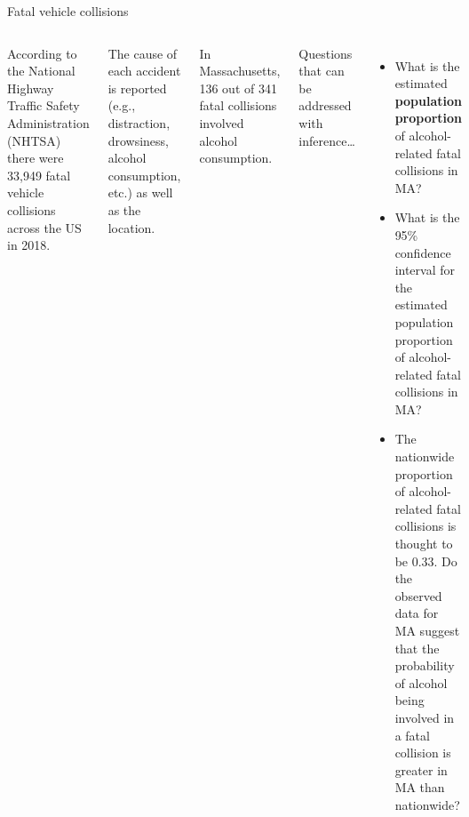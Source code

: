 \documentclass[
  ignorenonframetext,
  aspectratio=169]{beamer}
\newcommand{\columnsbegin}{\begin{columns}}
\newcommand{\columnsend}{\end{columns}}
\begin{document}
\begin{frame}{Fatal vehicle collisions}
\protect\hypertarget{fatal-vehicle-collisions}{}
\columnsbegin


\footnotesize

According to the National Highway Traffic Safety Administration (NHTSA)
there were 33,949 fatal vehicle collisions across the US in 2018.

\vspace{0.25cm}

The cause of each accident is reported (e.g., distraction, drowsiness,
alcohol consumption, etc.) as well as the location.

\vspace{0.25cm}

In Massachusetts, 136 out of 341 fatal collisions involved alcohol
consumption.


\footnotesize

Questions that can be addressed with inference\ldots{}

\begin{itemize}
\item
  What is the estimated \textbf{population proportion} of
  alcohol-related fatal collisions in MA?
\item
  What is the 95\% confidence interval for the estimated population
  proportion of alcohol-related fatal collisions in MA?
\item
  The nationwide proportion of alcohol-related fatal collisions is
  thought to be 0.33. Do the observed data for MA suggest that the
  probability of alcohol being involved in a fatal collision is greater
  in MA than nationwide?
\end{itemize}

\columnsend
\end{frame}
\end{document}
